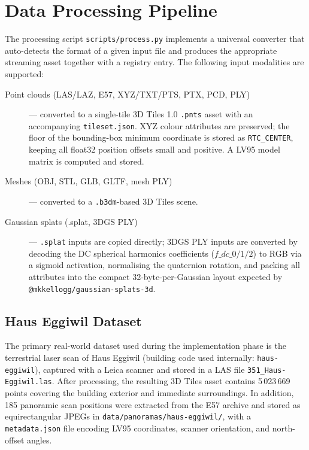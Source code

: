 \section{Data Processing Pipeline}
\label{sec:pipeline}

The processing script \texttt{scripts/process.py} implements a universal
converter that auto-detects the format of a given input file and produces
the appropriate streaming asset together with a registry entry. The following
input modalities are supported:

\begin{description}
  \item[Point clouds (LAS/LAZ, E57, XYZ/TXT/PTS, PTX, PCD, PLY)] — converted
    to a single-tile 3D Tiles 1.0 \texttt{.pnts} asset with an accompanying
    \texttt{tileset.json}. XYZ colour attributes are preserved; the floor of
    the bounding-box minimum coordinate is stored as \texttt{RTC\_CENTER},
    keeping all float32 position offsets small and positive. A LV95 model
    matrix is computed and stored.
  \item[Meshes (OBJ, STL, GLB, GLTF, mesh PLY)] — converted to a
    \texttt{.b3dm}-based 3D Tiles scene.
  \item[Gaussian splats (.splat, 3DGS PLY)] — \texttt{.splat} inputs are
    copied directly; 3DGS PLY inputs are converted by decoding the DC
    spherical harmonics coefficients ($f\_dc\_0/1/2$) to RGB via a sigmoid
    activation, normalising the quaternion rotation, and packing all
    attributes into the compact 32-byte-per-Gaussian layout expected by
    \texttt{@mkkellogg/gaussian-splats-3d}.
\end{description}

\subsection{Haus Eggiwil Dataset}

The primary real-world dataset used during the implementation phase is the
terrestrial laser scan of Haus Eggiwil (building code used internally:
\texttt{haus-eggiwil}), captured with a Leica scanner and stored in a LAS file
\texttt{351\_Haus-Eggiwil.las}. After processing, the resulting 3D Tiles asset
contains 5\,023\,669 points covering the building exterior and immediate
surroundings. In addition, 185 panoramic scan positions were extracted from the
E57 archive and stored as equirectangular JPEGs in
\texttt{data/panoramas/haus-eggiwil/}, with a \texttt{metadata.json} file
encoding LV95 coordinates, scanner orientation, and north-offset angles.

